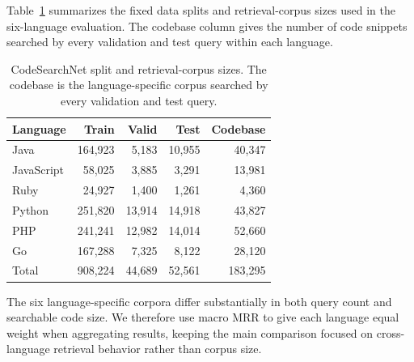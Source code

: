 \documentclass[11pt]{article}
\begin{document}
Table~\ref{tab:dataset_stats} summarizes the fixed data splits and retrieval-corpus sizes used in the six-language evaluation. The codebase column gives the number of code snippets searched by every validation and test query within each language.

\begin{table}[t]
  \centering
  \scriptsize
  \setlength{\tabcolsep}{3.5pt}
  \begin{tabular}{lrrrr}
    \toprule
    Language & Train & Valid & Test & Codebase \\
    \midrule
    Java       & 164,923 & 5,183  & 10,955 & 40,347 \\
    JavaScript & 58,025  & 3,885  & 3,291  & 13,981 \\
    Ruby       & 24,927  & 1,400  & 1,261  & 4,360 \\
    Python     & 251,820 & 13,914 & 14,918 & 43,827 \\
    PHP        & 241,241 & 12,982 & 14,014 & 52,660 \\
    Go         & 167,288 & 7,325  & 8,122  & 28,120 \\
    \midrule
    Total      & 908,224 & 44,689 & 52,561 & 183,295 \\
    \bottomrule
  \end{tabular}
  \caption{CodeSearchNet split and retrieval-corpus sizes. The codebase is the language-specific corpus searched by every validation and test query.}
  \label{tab:dataset_stats}
\end{table}

The six language-specific corpora differ substantially in both query count and searchable code size. We therefore use macro MRR to give each language equal weight when aggregating results, keeping the main comparison focused on cross-language retrieval behavior rather than corpus size.
\end{document}
